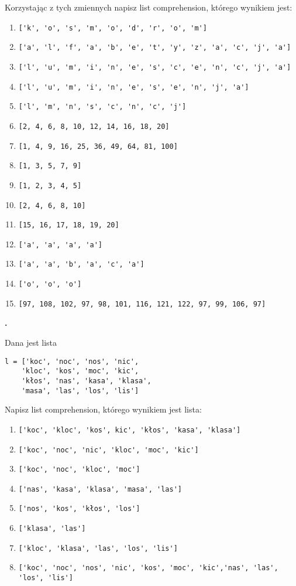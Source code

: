 \documentclass[a4paper]{article}
\begin{document}
Korzystając z tych zmiennych napisz list comprehension, którego wynikiem jest:
\begin{enumerate}[label=\arabic*.]
    \item \verb|['k', 'o', 's', 'm', 'o', 'd', 'r', 'o', 'm']|
    \item \verb|['a', 'l', 'f', 'a', 'b', 'e', 't', 'y', 'z', 'a', 'c', 'j', 'a']|
    \item \verb|['l', 'u', 'm', 'i', 'n', 'e', 's', 'c', 'e', 'n', 'c', 'j', 'a']|
    \item \verb|['l', 'u', 'm', 'i', 'n', 'e', 's', 'e', 'n', 'j', 'a']|
    \item \verb|['l', 'm', 'n', 's', 'c', 'n', 'c', 'j']|
    \item \verb|[2, 4, 6, 8, 10, 12, 14, 16, 18, 20]|
    \item \verb|[1, 4, 9, 16, 25, 36, 49, 64, 81, 100]|
    \item \verb|[1, 3, 5, 7, 9]|
    \item \verb|[1, 2, 3, 4, 5]|
    \item \verb|[2, 4, 6, 8, 10]|
    \item \verb|[15, 16, 17, 18, 19, 20]|
    \item \verb|['a', 'a', 'a', 'a']|
    \item \verb|['a', 'a', 'b', 'a', 'c', 'a']|
    \item \verb|['o', 'o', 'o']|
    \item \verb|[97, 108, 102, 97, 98, 101, 116, 121, 122, 97, 99, 106, 97]|
\end{enumerate}

\textbf{.}\addtocounter{zadanie}{1} Dana jest lista
\begin{verbatim}
l = ['koc', 'noc', 'nos', 'nic',
    'kloc', 'kos', 'moc', 'kic',
    'kłos', 'nas', 'kasa', 'klasa',
    'masa', 'las', 'los', 'lis']
\end{verbatim}
Napisz list comprehension, którego wynikiem jest lista:
\begin{enumerate}[label=\arabic*.]
    \item \verb|['koc', 'kloc', 'kos', kic', 'kłos', 'kasa', 'klasa']|
    \item \verb|['koc', 'noc', 'nic', 'kloc', 'moc', 'kic']|
    \item \verb|['koc', 'noc', 'kloc', 'moc']|
    \item \verb|['nas', 'kasa', 'klasa', 'masa', 'las']|
    \item \verb|['nos', 'kos', 'kłos', 'los']|
    \item \verb|['klasa', 'las']|
    \item \verb|['kloc', 'klasa', 'las', 'los', 'lis']|
    \item \verb|['koc', 'noc', 'nos', 'nic', 'kos', 'moc', 'kic','nas', 'las', 'los', 'lis']|
\end{enumerate}
\end{document}
